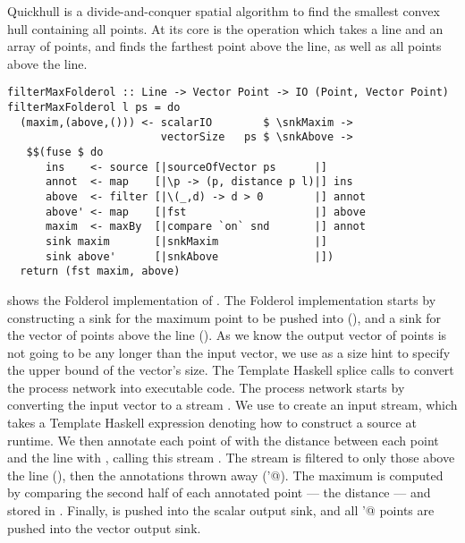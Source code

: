 Quickhull is a divide-and-conquer spatial algorithm to find the smallest convex hull containing all points.
At its core is the \Hs@filterMax@ operation which takes a line and an array of points, and finds the farthest point above the line, as well as all points above the line.

\begin{lstlisting}[float,label=l:bench:filterMaxFolderol,caption=Folderol implementation of \Hs/filterMax/]
filterMaxFolderol :: Line -> Vector Point -> IO (Point, Vector Point)
filterMaxFolderol l ps = do
  (maxim,(above,())) <- scalarIO        $ \snkMaxim ->
                        vectorSize   ps $ \snkAbove ->
   $$(fuse $ do
      ins    <- source [|sourceOfVector ps      |]
      annot  <- map    [|\p -> (p, distance p l)|] ins
      above  <- filter [|\(_,d) -> d > 0        |] annot
      above' <- map    [|fst                    |] above
      maxim  <- maxBy  [|compare `on` snd       |] annot
      sink maxim       [|snkMaxim               |]
      sink above'      [|snkAbove               |])
  return (fst maxim, above)
\end{lstlisting}

 shows the Folderol implementation of \Hs@filterMax@.
The Folderol implementation starts by constructing a sink for the maximum point to be pushed into (\Hs@snkMaxim@), and a sink for the vector of points above the line (\Hs@snkAbove@).
As we know the output vector of points is not going to be any longer than the input vector, we use \Hs@vectorSize@ as a size hint to specify the upper bound of the vector's size.
The Template Haskell splice calls \Hs@fuse@ to convert the process network into executable code.
The process network starts by converting the input vector \Hs@pts@ to a stream \Hs@ins@.
We use \Hs@source@ to create an input stream, which takes a Template Haskell expression denoting how to construct a source at runtime.
We then annotate each point of \Hs@ins@ with the distance between each point and the line with \Hs@map@, calling this stream \Hs@annot@.
The \Hs@annot@ stream is filtered to only those above the line (\Hs@above@), then the annotations thrown away (\Hs@above'@).
The maximum is computed by comparing the second half of each annotated point --- the distance --- and stored in \Hs@maxim@.
Finally, \Hs@maxim@ is pushed into the scalar output sink, and all \Hs@above'@ points are pushed into the vector output sink.


